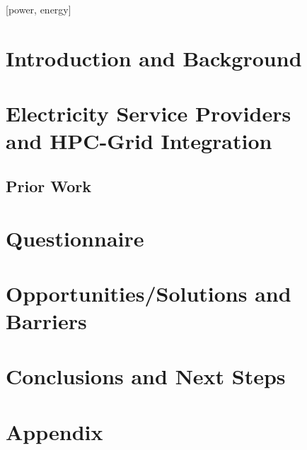 \documentclass{../style/sig-alternate}
\begin{document}

[power, energy]



%
\section{Introduction and Background}

\label{sec:intro}

\section{Electricity Service Providers\\
 and HPC-Grid Integration}

\label{sec:supercomputer}

\subsection{Prior Work}

\label{sec:priorwork}

\section{Questionnaire} 

\label{sec:questionnaire}

%

\section{Opportunities/Solutions and\\ Barriers} 

\label{sec:opportunities}


\section{Conclusions and Next Steps}

\label{sec:conclusion}


%
%

%

%

\section*{Appendix}
\label{Appendix}

\end{document}
